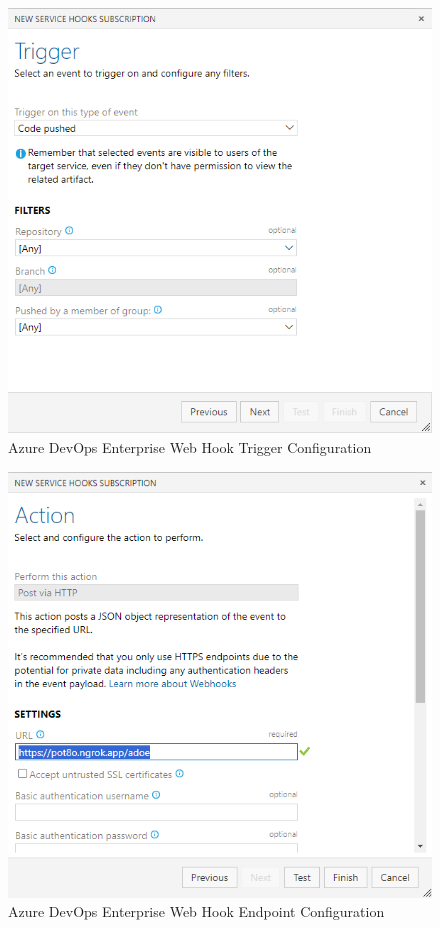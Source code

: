 \begin{figure}[ht]
    \includegraphics[width=\textwidth]{graphics/adoe-hook-trigger-config.png}
    \caption{Azure DevOps Enterprise Web Hook Trigger Configuration}
    \label{fig:adoe-trigger-config}
\end{figure}

\begin{figure}[ht]
    \includegraphics[width=\textwidth]{graphics/adoe-hook-endpoint-config.png}
    \caption{Azure DevOps Enterprise Web Hook Endpoint Configuration}
    \label{fig:adoe-endpoint-config}
\end{figure}

